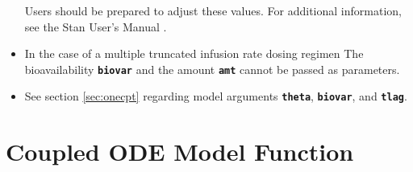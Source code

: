 \documentclass[11pt, reqno, oneside]{amsbook}
\numberwithin{equation}{chapter}
\numberwithin{figure}{chapter}
\numberwithin{table}{chapter}
\theoremstyle{remark}
\begin{document}
\begin{itemize}
Users should be prepared to adjust these
values. For additional information, see the Stan User's
Manual \cite{stan_team_2017}.
\item In the case of a multiple truncated infusion rate dosing regimen
The bioavailability {\small \color{MRGGreen} \texttt{\textbf{biovar}}} and the amount {\small \color{MRGGreen} \texttt{\textbf{amt}}} cannot be passed as parameters.
\item See section \ref{sec:onecpt} regarding model arguments {\small \color{MRGGreen} \texttt{\textbf{theta}}},
{\small \color{MRGGreen} \texttt{\textbf{biovar}}}, and {\small \color{MRGGreen} \texttt{\textbf{tlag}}}.
\end{itemize}

\section{Coupled ODE Model Function}
\label{sec:org0e4356c}
\label{sec:mixed}
\end{document}
